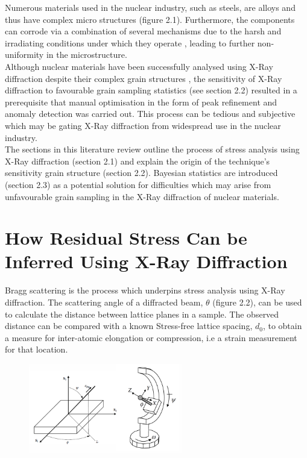 Numerous materials used in the nuclear industry, such as steels, are alloys \cite{internationalatomicenergyagency_2012_structural} and thus have complex micro structures (figure 2.1). \cite{matsuoka_1990_a} Furthermore, the components can corrode via a combination of several mechanisms due to the harsh and irradiating conditions under which they operate \cite{berg_2009_corrosion}, leading to further non-uniformity in the microstructure.\\ 



Although nuclear materials have been successfully analysed using X-Ray diffraction despite their complex grain structures \cite{shanhua_2015_threedimensional}, the sensitivity of X-Ray diffraction to favourable grain sampling statistics (see section 2.2) resulted in a prerequisite that manual optimisation in the form of peak refinement and anomaly detection was carried out. \cite{scheidegger_2000_correction} This process can be tedious and subjective \cite{he_2018_twodimensional} which may be gating X-Ray diffraction from widespread use in the nuclear industry.\\ 

The sections in this literature review outline the process of stress analysis using X-Ray diffraction (section 2.1) and explain the origin of the technique's sensitivity grain structure (section 2.2). Bayesian statistics are introduced (section 2.3) as a potential solution for difficulties which may arise from unfavourable grain sampling in the X-Ray diffraction of nuclear materials.\\

\section{How Residual Stress Can be Inferred Using X-Ray Diffraction}
\label{sec:sec01}

Bragg scattering is the process which underpins stress analysis using X-Ray diffraction. The scattering angle of a diffracted beam, $\theta$ (figure 2.2), can be used to calculate the distance between lattice planes in a sample. The observed distance can be compared with a known Stress-free lattice spacing, $d_{0}$, to obtain a measure for inter-atomic elongation or compression, i.e a strain measurement for that location. \cite{he_2018_twodimensional}

 \begin{figure}[h]
 	\centering
 	\includegraphics[width=0.6\textwidth]{chapters/chapter01/fig01/diffracion angles.png}
    \label{fig:RHP02}
 \end{figure}

